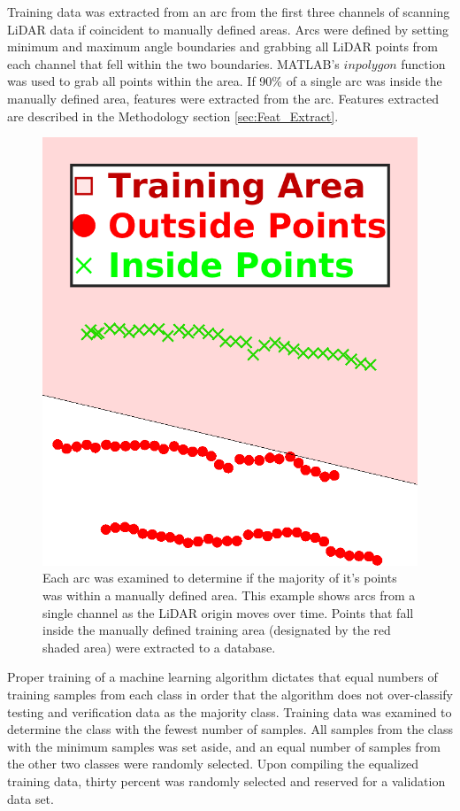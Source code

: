 \documentclass[numbered,pdftex]{ohio-etd}
\begin{document}
{{		{Training data was extracted from an arc from the first three channels of scanning LiDAR data if coincident to manually defined areas. Arcs were defined by setting minimum and maximum angle boundaries and grabbing all LiDAR points from each channel that fell within the two boundaries. MATLAB's $inpolygon$ function was used to grab all points within the area. If 90\% of a single arc was inside the manually defined area, features were extracted from the arc. Features extracted are described in the Methodology section \ref{sec:Feat_Extract}.} 
		
		\begin{figure}[H]
			\centering
			\includegraphics[width=0.5\linewidth]{Defense_Images/inside_outside_point_example}
			\caption[Coincident Point Example]{Each arc was examined to determine if the majority of it's points was within a manually defined area. This example shows arcs from a single channel as the LiDAR origin moves over time. Points that fall inside the manually defined training area (designated by the red shaded area) were extracted to a database. }
			\label{fig:arc_in_mca_or_not}
		\end{figure}
		
		{Proper training of a machine learning algorithm dictates that equal numbers of training samples from each class in order that the algorithm does not over-classify testing and verification data as the majority class. Training data was examined to determine the class with the fewest number of samples. All samples from the class with the minimum samples was set aside, and an equal number of samples from the other two classes were randomly selected. Upon compiling the equalized training data, thirty percent was randomly selected and reserved for a validation data set.}
		
}}
\end{document}
